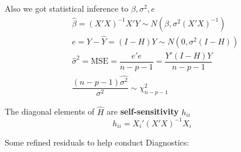     Also we got statistical inference to $ \beta ,\sigma ^2, e $
    \begin{align}
        &\hat{\beta }=(X'X)^{-1}X'Y\sim N(\beta ,\sigma ^2(X'X)^{-1})\\
        &e=Y-\hat{Y}=(I-H)Y \sim N(0,\sigma ^2(I-H))\\
        &\hat{\sigma }^2=\mathrm{MSE}=\dfrac{e'e}{n-p-1}=\dfrac{Y'(I-H)Y}{n-p-1}\\
        &\dfrac{(n-p-1)\hat{\sigma ^2}}{\sigma ^2}\sim  \chi^2_{n-p-1} 
    \end{align}
 
    The diagonal elements  of $ \hat{H} $ are \textbf{self-sensitivity} $ h_{ii} $
    \begin{equation}
        h_{ii}=X_i'(X'X)^{-1}X_i
    \end{equation}
    
    



\begin{point}
    Some refined residuals to help conduct Diagnostics:
\end{point}
    
